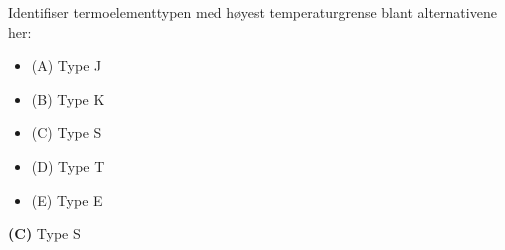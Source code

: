 

Identifiser termoelementtypen med høyest temperaturgrense blant alternativene her:

\begin{itemize}
\item{(A)} Type J
\vskip 5pt 
\item{(B)} Type K
\vskip 5pt 
\item{(C)} Type S
\vskip 5pt 
\item{(D)} Type T
\vskip 5pt 
\item{(E)} Type E
\end{itemize}







{\bf (C)} Type S
 









